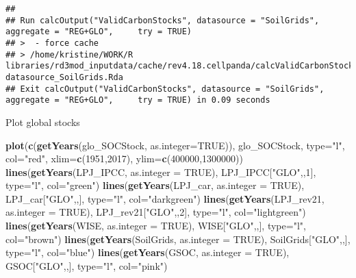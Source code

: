 \documentclass[
]{article}
\newenvironment{Shaded}{\begin{snugshade}}{\end{snugshade}}
\newcommand{\DataTypeTok}[1]{\textcolor[rgb]{0.13,0.29,0.53}{#1}}
\newcommand{\DecValTok}[1]{\textcolor[rgb]{0.00,0.00,0.81}{#1}}
\newcommand{\KeywordTok}[1]{\textcolor[rgb]{0.13,0.29,0.53}{\textbf{#1}}}
\newcommand{\NormalTok}[1]{#1}
\newcommand{\OtherTok}[1]{\textcolor[rgb]{0.56,0.35,0.01}{#1}}
\newcommand{\StringTok}[1]{\textcolor[rgb]{0.31,0.60,0.02}{#1}}
\begin{document}
\begin{verbatim}
## 
## Run calcOutput("ValidCarbonStocks", datasource = "SoilGrids", aggregate = "REG+GLO",     try = TRUE)
## >  - force cache 
## > /home/kristine/WORK/R libraries/rd3mod_inputdata/cache/rev4.18.cellpanda/calcValidCarbonStocks-datasource_SoilGrids.Rda
## Exit calcOutput("ValidCarbonStocks", datasource = "SoilGrids", aggregate = "REG+GLO",     try = TRUE) in 0.09 seconds
\end{verbatim}

Plot global stocks

\begin{Shaded}
\begin{Highlighting}[]
\KeywordTok{plot}\NormalTok{(}\KeywordTok{c}\NormalTok{(}\KeywordTok{getYears}\NormalTok{(glo\_SOCStock, }\DataTypeTok{as.integer=}\OtherTok{TRUE}\NormalTok{)), glo\_SOCStock, }\DataTypeTok{type=}\StringTok{"l"}\NormalTok{, }\DataTypeTok{col=}\StringTok{"red"}\NormalTok{, }\DataTypeTok{xlim=}\KeywordTok{c}\NormalTok{(}\DecValTok{1951}\NormalTok{,}\DecValTok{2017}\NormalTok{),  }\DataTypeTok{ylim=}\KeywordTok{c}\NormalTok{(}\DecValTok{400000}\NormalTok{,}\DecValTok{1300000}\NormalTok{))}
\KeywordTok{lines}\NormalTok{(}\KeywordTok{getYears}\NormalTok{(LPJ\_IPCC, }\DataTypeTok{as.integer =} \OtherTok{TRUE}\NormalTok{), LPJ\_IPCC[}\StringTok{"GLO"}\NormalTok{,,}\DecValTok{1}\NormalTok{], }\DataTypeTok{type=}\StringTok{"l"}\NormalTok{, }\DataTypeTok{col=}\StringTok{"green"}\NormalTok{)}
\KeywordTok{lines}\NormalTok{(}\KeywordTok{getYears}\NormalTok{(LPJ\_car, }\DataTypeTok{as.integer =} \OtherTok{TRUE}\NormalTok{), LPJ\_car[}\StringTok{"GLO"}\NormalTok{,,], }\DataTypeTok{type=}\StringTok{"l"}\NormalTok{, }\DataTypeTok{col=}\StringTok{"darkgreen"}\NormalTok{)}
\KeywordTok{lines}\NormalTok{(}\KeywordTok{getYears}\NormalTok{(LPJ\_rev21, }\DataTypeTok{as.integer =} \OtherTok{TRUE}\NormalTok{), LPJ\_rev21[}\StringTok{"GLO"}\NormalTok{,,}\DecValTok{2}\NormalTok{], }\DataTypeTok{type=}\StringTok{"l"}\NormalTok{, }\DataTypeTok{col=}\StringTok{"lightgreen"}\NormalTok{)}
\KeywordTok{lines}\NormalTok{(}\KeywordTok{getYears}\NormalTok{(WISE, }\DataTypeTok{as.integer =} \OtherTok{TRUE}\NormalTok{), WISE[}\StringTok{"GLO"}\NormalTok{,,], }\DataTypeTok{type=}\StringTok{"l"}\NormalTok{, }\DataTypeTok{col=}\StringTok{"brown"}\NormalTok{)}
\KeywordTok{lines}\NormalTok{(}\KeywordTok{getYears}\NormalTok{(SoilGrids, }\DataTypeTok{as.integer =} \OtherTok{TRUE}\NormalTok{), SoilGrids[}\StringTok{"GLO"}\NormalTok{,,], }\DataTypeTok{type=}\StringTok{"l"}\NormalTok{, }\DataTypeTok{col=}\StringTok{"blue"}\NormalTok{)}
\KeywordTok{lines}\NormalTok{(}\KeywordTok{getYears}\NormalTok{(GSOC, }\DataTypeTok{as.integer =} \OtherTok{TRUE}\NormalTok{), GSOC[}\StringTok{"GLO"}\NormalTok{,,], }\DataTypeTok{type=}\StringTok{"l"}\NormalTok{, }\DataTypeTok{col=}\StringTok{"pink"}\NormalTok{)}
\end{Highlighting}
\end{Shaded}
\end{document}
